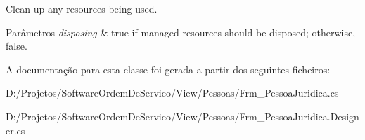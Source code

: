 Clean up any resources being used. 


\begin{DoxyParams}{Parâmetros}
{\em disposing} & true if managed resources should be disposed; otherwise, false.\\
\hline
\end{DoxyParams}


A documentação para esta classe foi gerada a partir dos seguintes ficheiros\+:\begin{DoxyCompactItemize}
\item 
D\+:/\+Projetos/\+Software\+Ordem\+De\+Servico/\+View/\+Pessoas/Frm\+\_\+\+Pessoa\+Juridica.\+cs\item 
D\+:/\+Projetos/\+Software\+Ordem\+De\+Servico/\+View/\+Pessoas/Frm\+\_\+\+Pessoa\+Juridica.\+Designer.\+cs\end{DoxyCompactItemize}
